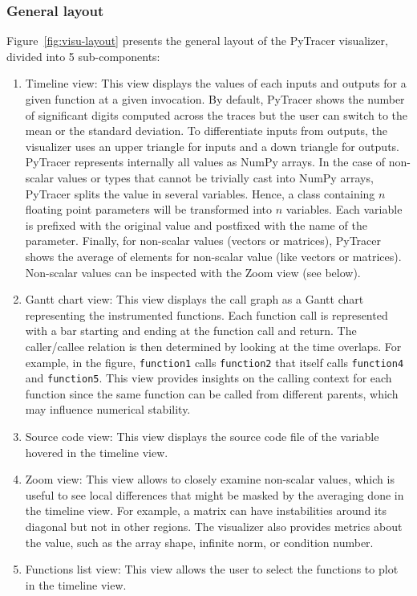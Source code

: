 \documentclass[11pt]{article}
\newcommand{\pytracer}[0]{PyTracer\xspace}
\begin{document}
\subsubsection{General layout}
Figure~\ref{fig:visu-layout} presents the general layout of the \pytracer visualizer, divided into 5 sub-components:
\begin{enumerate}
 \item Timeline view: This view displays the values of each inputs and outputs for a given function at a given
    invocation. By default, \pytracer shows the number of significant digits computed across the traces but the user 
    can switch to the mean or the standard deviation. To differentiate inputs from outputs, the visualizer
    uses an upper triangle for inputs and a down triangle for outputs. \pytracer represents internally all values 
    as NumPy arrays.
    In the case of non-scalar values or types that 
    cannot be trivially cast into NumPy arrays, \pytracer splits the value in several variables. Hence, a class containing
    $n$ floating point parameters will be transformed into $n$ variables. Each variable is prefixed with the original value
    and postfixed with the name of the parameter. 
    Finally, for non-scalar values (vectors or matrices), \pytracer shows the average of elements for non-scalar value (like vectors or matrices). Non-scalar values can be inspected with the Zoom view (see below).
 \item Gantt chart view: This view displays the call graph as a Gantt chart representing the instrumented functions. Each function call
    is represented with a bar starting and ending at the function call and return.
    The caller/callee relation is then determined by looking at the time overlaps.
    For example, in the figure, \texttt{function1} calls \texttt{function2} that itself calls \texttt{function4} and \texttt{function5}. 
    This view provides insights on the calling context for each function since the same function can be called from different 
    parents, which may influence numerical stability. 
 \item  Source code view: This view displays the source code file of the variable hovered in the timeline view. 
 \item  Zoom view: This view allows to closely examine non-scalar values, which is useful to see local differences that might
    be masked by the averaging done in the timeline view. For example, a matrix can have instabilities around its diagonal but not in other regions.
    The visualizer also provides metrics about the value, such as the array shape, infinite norm, or condition number.
\item  Functions list view: This view allows the user to select the functions to plot in the timeline view.
\end{enumerate}
\end{document}
